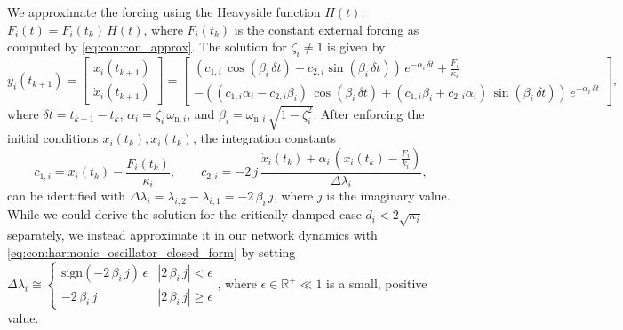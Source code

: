  We approximate the forcing using the Heavyside function $H(t)$: $F_i(t) = F_{i}(t_k) \, H(t)$, where $F_{i}(t_k)$ is the constant external forcing as computed by \eqref{eq:con:con_approx}. The solution for $\zeta_i \neq 1$ is given by~\cite{Pas2023damped}
\begin{equation}\label{eq:con:harmonic_oscillator_closed_form}
    y_i (t_{k+1}) 
    = \begin{bmatrix}
        x_i(t_{k+1})\\
        \dot{x}_i(t_{k+1})
    \end{bmatrix} 
    = \begin{bmatrix}
        \left ( c_{1,i} \, \cos(\beta_i \, \delta t) +  c_{2,i} \sin(\beta_i \, \delta t) \right ) \, e^{-\alpha_i \, \delta t} + \frac{F_{i}}{\kappa_i}\\
        -\left ( (c_{1,i} \alpha_i - c_{2,i} \beta_i) \, \cos(\beta_i \, \delta t) +  (c_{1,i} \beta_i + c_{2,i} \alpha_i) \, \sin(\beta_i \, \delta t) \right ) \, e^{-\alpha_i \, \delta t}
    \end{bmatrix},
\end{equation}
where $\delta t = t_{k+1} - t_k$, $\alpha_i = \zeta_i \, \omega_{\mathrm{n},i}$, and $\beta_i = \omega_{\mathrm{n},i} \, \sqrt{1-\zeta_i^2}$.
After enforcing the initial conditions $x_i(t_k), x_i(t_k)$, the integration constants
\begin{equation}
    c_{1,i} = x_i(t_k) - \frac{F_{i}(t_k)}{\kappa_i},
    \qquad
    c_{2,i} = - 2 \, j \, \frac{\dot{x}_i(t_k) + \alpha_i \, \left (x_i(t_k) - \frac{F_{i}}{k_i} \right )}{\Delta \lambda_i},
\end{equation}
can be identified with $\Delta \lambda_i = \lambda_{i,2} - \lambda_{i,1} = - 2 \, \beta_i \, j$, where $j$ is the imaginary value.
While we could derive the solution for the critically damped case $d_i < 2 \sqrt{\kappa_i}$ separately, we instead approximate it in our network dynamics with \eqref{eq:con:harmonic_oscillator_closed_form} by setting
$\Delta \lambda_i \cong \begin{cases}
    \mathrm{sign}(-2 \, \beta_i \, j) \, \epsilon   & |2 \, \beta_i \, j| < \epsilon \\
    - 2 \, \beta_i \, j & |2 \, \beta_i \, j| \geq \epsilon
\end{cases}$, where $\epsilon \in \mathbb{R}^+ \ll 1$ is a small, positive value.

